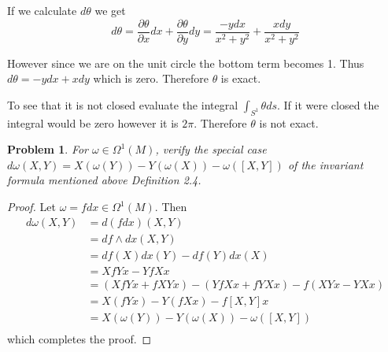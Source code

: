 \documentclass[10pt]{article}
\newcommand{\sk}{\vskip 10mm}
\theoremstyle{plain}
\newtheorem{problem}{Problem}
\theoremstyle{remark}
\begin{document}
If we calculate $d\theta$ we get
\[
  d\theta = \frac{\partial \theta}{\partial x}dx+\frac{\partial\theta}{\partial y}dy = \frac{-ydx}{x^2+y^2} + \frac{xdy}{x^2+y^2}
\]

However since we are on the unit circle the bottom term becomes 1. Thus
$d\theta=-ydx+xdy$ which is zero. Therefore $\theta$ is exact.

To see that it is not closed evaluate the integral $\int_{S^1}\theta ds$. If it
were closed the integral would be zero however it is $2\pi$. Therefore
$\theta$ is not exact.

\sk

\begin{problem}
  For $\omega\in\Omega^1(M)$, verify the special case
  $d\omega(X,Y)=X(\omega(Y))-Y(\omega(X))-\omega([X,Y])$ of the invariant
  formula mentioned above Definition 2.4.
\end{problem}

\begin{proof}
  Let $\omega=fdx\in\Omega^1(M)$. Then
  \begin{align*}
    d\omega(X,Y) &= d(fdx)(X,Y) \\
            &= df\wedge dx(X,Y) \\
            &= df(X)dx(Y)-df(Y)dx(X) \\
            &= XfYx-YfXx \\
            &= (XfYx+fXYx)-(YfXx+fYXx)-f(XYx-YXx) \\
            &= X(fYx)-Y(fXx)-f[X,Y]x \\
            &= X(\omega(Y))-Y(\omega(X))-\omega([X,Y])\\
  \end{align*}
  which completes the proof.
\end{proof}

\end{document}
